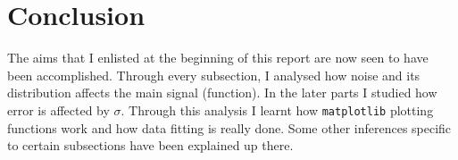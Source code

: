 \documentclass[11pt, a4paper]{article}
\begin{document}
\section{Conclusion}
The aims that I enlisted at the beginning of this report are now seen to have been accomplished. Through every subsection, I analysed how noise and its distribution affects the main signal (function). In the later parts I studied how error is affected by $\sigma$. Through this analysis I learnt how \texttt{matplotlib} plotting functions work and how data fitting is really done. Some other inferences specific to certain subsections have been explained up there. 
    
\end{document}
